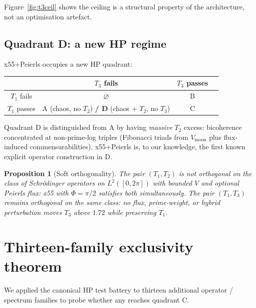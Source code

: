 \documentclass[11pt,a4paper]{article}
\newtheorem{proposition}{Proposition}
\begin{document}
Figure~\ref{fig:t3ceil} shows the ceiling is a structural property of
the architecture, not an optimisation artefact.

\subsection{Quadrant D: a new HP regime}

x55+Peierls occupies a new HP quadrant:

\begin{center}
\begin{tabular}{c@{\hspace{2em}}ccc}
\toprule
 & $T_3$ fails & $T_3$ passes \\
\midrule
$T_1$ fails & $\varnothing$ & B \\
$T_1$ passes & A (chaos, no $T_2$) \textbf{/ D} (chaos + $T_2$, no $T_3$) & C \\
\bottomrule
\end{tabular}
\end{center}

Quadrant D is distinguished from A by having \emph{massive} $T_2$
excess: bicoherence concentrated at non-prime-log triples (Fibonacci
triads from $V_\text{moon}$ plus flux-induced commensurabilities).
x55+Peierls is, to our knowledge, the first known explicit operator
construction in D.

\begin{proposition}[Soft orthogonality]\label{prop:softorth}
The pair $(T_1, T_2)$ is not orthogonal on the class of Schr\"odinger
operators on $L^2([0,2\pi])$ with bounded $V$ and optional Peierls
flux: x55 with $\Phi=\pi/2$ satisfies both simultaneously. The
pair $(T_1, T_3)$ remains orthogonal on the same class: no flux,
prime-weight, or hybrid perturbation moves $T_3$ above $1.72$ while
preserving $T_1$.
\end{proposition}

\section{Thirteen-family exclusivity theorem}\label{sec:exclusivity}

We applied the canonical HP test battery to thirteen additional
operator / spectrum families to probe whether any reaches quadrant C.
\end{document}
